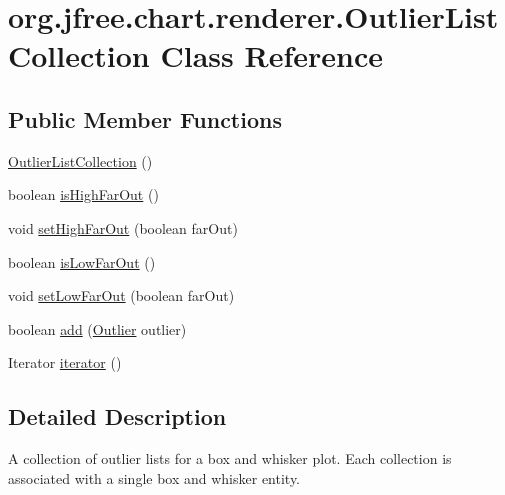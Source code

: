 \hypertarget{classorg_1_1jfree_1_1chart_1_1renderer_1_1_outlier_list_collection}{}\section{org.\+jfree.\+chart.\+renderer.\+Outlier\+List\+Collection Class Reference}
\label{classorg_1_1jfree_1_1chart_1_1renderer_1_1_outlier_list_collection}
\subsection*{Public Member Functions}
\begin{DoxyCompactItemize}
\item 
\mbox{\hyperlink{classorg_1_1jfree_1_1chart_1_1renderer_1_1_outlier_list_collection_a18716ab656431bdac81f60d0e0984e8e}{Outlier\+List\+Collection}} ()
\item 
boolean \mbox{\hyperlink{classorg_1_1jfree_1_1chart_1_1renderer_1_1_outlier_list_collection_afbde934fba8104920eb66abae9ac7328}{is\+High\+Far\+Out}} ()
\item 
void \mbox{\hyperlink{classorg_1_1jfree_1_1chart_1_1renderer_1_1_outlier_list_collection_a541fb70b3f4419a17ebb65f66d15d125}{set\+High\+Far\+Out}} (boolean far\+Out)
\item 
boolean \mbox{\hyperlink{classorg_1_1jfree_1_1chart_1_1renderer_1_1_outlier_list_collection_a863ada14c9504cb00eb99b6db61e78a1}{is\+Low\+Far\+Out}} ()
\item 
void \mbox{\hyperlink{classorg_1_1jfree_1_1chart_1_1renderer_1_1_outlier_list_collection_a2d624a1d2e6d83adc502ac486e00cd0a}{set\+Low\+Far\+Out}} (boolean far\+Out)
\item 
boolean \mbox{\hyperlink{classorg_1_1jfree_1_1chart_1_1renderer_1_1_outlier_list_collection_ad82451fdecfa6649bd512804f6c41cfc}{add}} (\mbox{\hyperlink{classorg_1_1jfree_1_1chart_1_1renderer_1_1_outlier}{Outlier}} outlier)
\item 
Iterator \mbox{\hyperlink{classorg_1_1jfree_1_1chart_1_1renderer_1_1_outlier_list_collection_afacb1b9a6f8bb4177fca137a4296d1c8}{iterator}} ()
\end{DoxyCompactItemize}


\subsection{Detailed Description}
A collection of outlier lists for a box and whisker plot. Each collection is associated with a single box and whisker entity.


